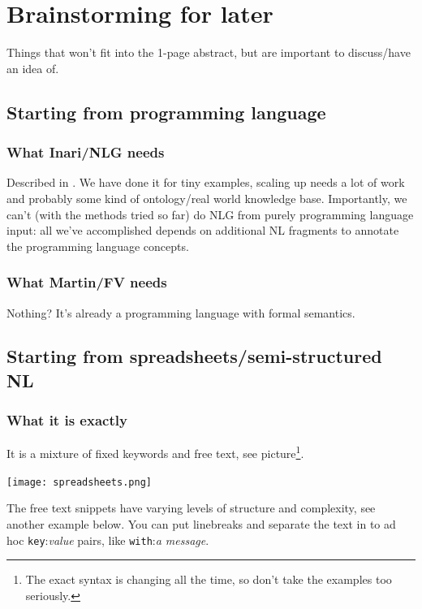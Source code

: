 \documentclass[runningheads]{llncs}
\begin{document}
\newpage
\section*{Brainstorming for later}
Things that won't fit into the 1-page abstract, but are important to discuss/have an idea of. 

\subsection*{Starting from programming language}

\subsubsection*{What Inari/NLG needs}

Described in \cite{listenmaa-etal-2021-towards}. %
We have done it for tiny examples, scaling up needs a lot of work and probably some kind of ontology/real world knowledge base. Importantly, we can't (with the methods tried so far) do NLG from purely programming language input: all we've accomplished depends on additional NL fragments to annotate the programming language concepts.

\subsubsection{What Martin/FV needs}

Nothing? It's already a programming language with formal semantics.


\subsection*{Starting from spreadsheets/semi-structured NL} 

\subsubsection{What it is exactly} It is a mixture of fixed keywords and free text, see picture\footnote{The exact syntax is changing all the time, so don't take the examples too seriously.}. 

\noindent \texttt{[image: spreadsheets.png]}


The free text snippets have varying levels of structure and complexity, see another example below. You can put linebreaks and separate the text in to ad hoc \texttt{key}:\textit{value} pairs, like \texttt{with}:\textit{a message}. \\
\end{document}
